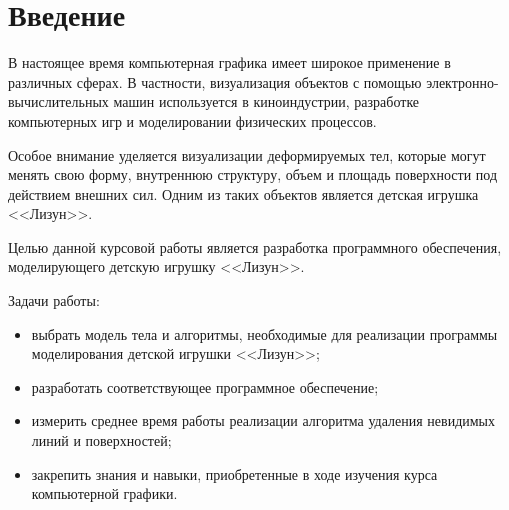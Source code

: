 \chapter*{Введение}

В настоящее время компьютерная графика имеет широкое применение в
различных сферах. В частности, визуализация объектов с помощью электронно-вычислительных машин используется в киноиндустрии, разработке компьютерных
игр и моделировании физических процессов.

Особое внимание уделяется визуализации деформируемых тел, которые
могут менять свою форму, внутреннюю структуру, объем и площадь поверхности
под действием внешних сил. Одним из таких объектов является детская игрушка
<<Лизун>>.

Целью данной курсовой работы является разработка программного обеспечения, моделирующего детскую игрушку <<Лизун>>.

Задачи работы:

\begin{itemize}
	\item выбрать модель тела и алгоритмы, необходимые для реализации программы моделирования детской игрушки <<Лизун>>;
	\item разработать соответствующее программное обеспечение;
	\item измерить среднее время работы реализации алгоритма удаления невидимых линий и поверхностей;
	\item закрепить знания и навыки, приобретенные в ходе изучения курса компьютерной графики.
\end{itemize}

\clearpage
